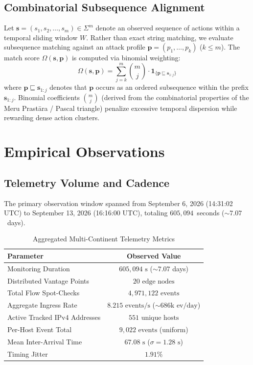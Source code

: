 \documentclass[10pt,twocolumn]{article}
\begin{document}
\subsection{Combinatorial Subsequence Alignment}
Let $\mathbf{s} = (s_1, s_2, \dots, s_m) \in \Sigma^m$ denote an observed sequence of actions within a temporal sliding window $W$. Rather than exact string matching, we evaluate subsequence matching against an attack profile $\mathbf{p} = (p_1, \dots, p_k)$ ($k \le m$). The match score $\Omega(\mathbf{s}, \mathbf{p})$ is computed via binomial weighting:
\begin{equation}
\Omega(\mathbf{s}, \mathbf{p}) = \sum_{j=k}^{m} \binom{m}{j} \cdot \mathbf{1}_{\{\mathbf{p} \sqsubseteq \mathbf{s}_{1:j}\}}
\end{equation}
where $\mathbf{p} \sqsubseteq \mathbf{s}_{1:j}$ denotes that $\mathbf{p}$ occurs as an ordered subsequence within the prefix $\mathbf{s}_{1:j}$. Binomial coefficients $\binom{m}{j}$ (derived from the combinatorial properties of the Meru Prast\={a}ra / Pascal triangle) penalize excessive temporal dispersion while rewarding dense action clusters.

\section{Empirical Observations}

\subsection{Telemetry Volume and Cadence}
The primary observation window spanned from September 6, 2026 (14:31:02 UTC) to September 13, 2026 (16:16:00 UTC), totaling $605,094$~seconds ($\sim 7.07$~days).

\begin{table}[h]
\centering
\small
\caption{Aggregated Multi-Continent Telemetry Metrics}
\label{tab:metrics}
\begin{tabular}{lc}
\toprule
\textbf{Parameter} & \textbf{Observed Value} \\
\midrule
Monitoring Duration & $605,094\text{ s}$ ($\sim 7.07$ days) \\
Distributed Vantage Points & $20\text{ edge nodes}$ \\
Total Flow Spot-Checks & $4,971,122\text{ events}$ \\
Aggregate Ingress Rate & $8.215\text{ events/s}$ ($\sim 686\text{k ev/day}$) \\
Active Tracked IPv4 Addresses & $551\text{ unique hosts}$ \\
Per-Host Event Total & $9,022\text{ events}$ (uniform) \\
Mean Inter-Arrival Time & $67.08\text{ s}$ ($\sigma = 1.28\text{ s}$) \\
Timing Jitter & $1.91\%$ \\
\bottomrule
\end{tabular}
\end{table}
\end{document}
